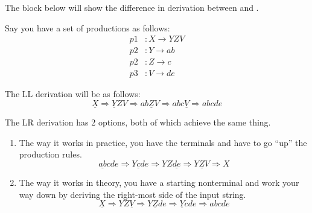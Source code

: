 The block below will show the difference in derivation between  and .
\begin{blackbox}
  Say you have a set of productions as follows:
  \begin{align*}
    p1&: X \rightarrow YZV \\
    p2&: Y \rightarrow ab \\
    p2&: Z \rightarrow c \\
    p3&: V \rightarrow de
  \end{align*}

  The LL derivation will be as follows:
  \begin{equation*}
    \underline{X} \Rightarrow \underline{Y}ZV \Rightarrow ab\underline{Z}V \Rightarrow abc\underline{V} \Rightarrow abcde
  \end{equation*}

  The LR derivation has 2 options, both of which achieve the same thing.
  \begin{enumerate}[noitemsep]
  \item The way it works in practice, you have the terminals and have to go ``up'' the production rules.
    \begin{equation*}
      \underline{ab}cde \Rightarrow Y\underline{c}de \Rightarrow YZ\underline{de} \Rightarrow \underline{YZV} \Rightarrow X
    \end{equation*}
  \item The way it works in theory, you have a starting nonterminal and work your way down by deriving the right-most side of the input string.
    \begin{equation*}
      \underline{X} \Rightarrow YZ\underline{V} \Rightarrow Y\underline{Z}de \Rightarrow \underline{Y}cde \Rightarrow abcde
    \end{equation*}
  \end{enumerate}
\end{blackbox}

